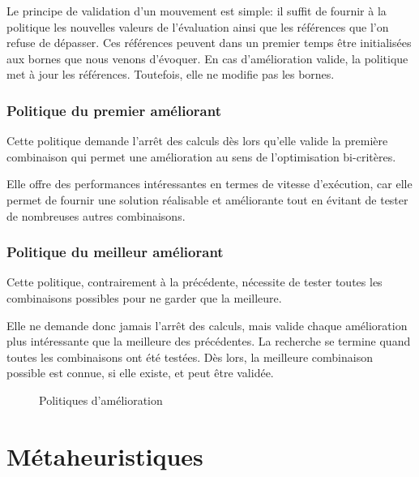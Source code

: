 			Le principe de validation d'un mouvement est simple: il suffit de fournir à la politique les nouvelles valeurs de l'évaluation ainsi que les références que l'on refuse de dépasser. Ces références peuvent dans un premier temps être initialisées aux bornes que nous venons d'évoquer. En cas d'amélioration valide, la politique met à jour les références. Toutefois, elle ne modifie pas les bornes.

			\subsubsection{Politique du premier améliorant}
				\label{subs:first_available_policy}
				Cette politique demande l'arrêt des calculs dès lors qu'elle valide la première combinaison qui permet une amélioration au sens de l'optimisation bi-critères. 

				Elle offre des performances intéressantes en termes de vitesse d'exécution, car elle permet de fournir une solution réalisable et améliorante tout en évitant de tester de nombreuses autres combinaisons.

			\subsubsection{Politique du meilleur améliorant}
				\label{subs:best_available_policy}
				Cette politique, contrairement à la précédente, nécessite de tester toutes les combinaisons possibles pour ne garder que la meilleure. 

				Elle ne demande donc jamais l'arrêt des calculs, mais valide chaque amélioration plus intéressante que la meilleure des précédentes. La recherche se termine quand toutes les combinaisons ont été testées. Dès lors, la meilleure combinaison possible est connue, si elle existe, et peut être validée.

				\begin{figure}[h!]
					\centering
					\begin{tikzpicture}
						
					\end{tikzpicture}
					\caption[UML -- Politiques d'amélioration]{Politiques d'amélioration}
					\label{uml:available-policies}
				\end{figure}


	\section{Métaheuristiques}


